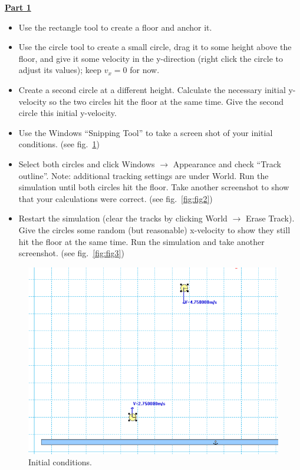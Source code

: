 \underline{\textbf{Part 1}} \par
\begin{itemize}
\item Use the rectangle tool to create a floor and anchor it.
\item Use the circle tool to create a small circle, drag it to some height above the floor, and give it some velocity in the y-direction (right click the circle to adjust its values); keep $v_x = 0$ for now.
\item Create a second circle at a different height.
Calculate the necessary initial y-velocity so the two circles hit the floor at the same time.
Give the second circle this initial y-velocity.
\item Use the Windows ``Snipping Tool'' to take a screen shot of your initial conditions. (see fig.~\ref{fig:fig1})
\item Select both circles and click Windows $\rightarrow$ Appearance and check ``Track outline''.
Note: additional tracking settings are under World.
Run the simulation until both circles hit the floor.
Take another screenshot to show that your calculations were correct. (see fig.~\ref{fig:fig2})
\item Restart the simulation (clear the tracks by clicking World $\rightarrow$ Erase Track).
Give the circles some random (but reasonable) x-velocity to show they still hit the floor at the same time.
Run the simulation and take another screenshot. (see fig.~\ref{fig:fig3})
\end{itemize}
%
\begin{figure}[H]
\centering
\includegraphics[scale=0.35]{figures/projectileMotion/fig1.png}
\caption{Initial conditions.}
\label{fig:fig1}
\end{figure}
